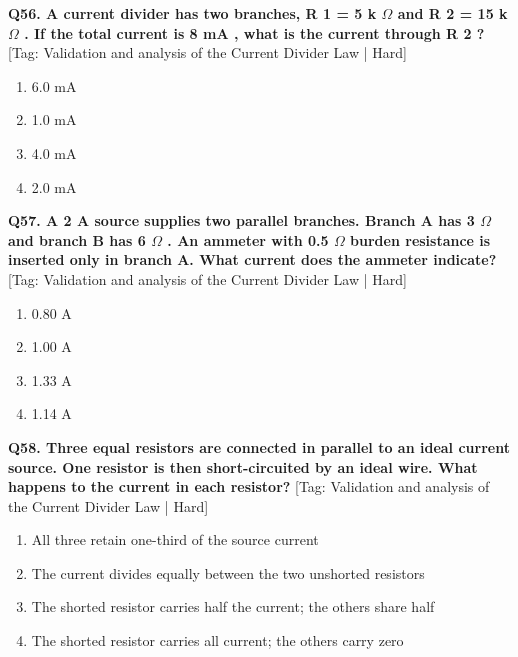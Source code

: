\noindent\textbf{Q56. A current divider has two branches, R 1 = 5 k $\Omega$ and R 2 = 15 k $\Omega$ . If the total current is 8 mA , what is the current through R 2 ?} \hfill [Tag: Validation and analysis of the Current Divider Law | Hard]
\begin{enumerate}[label=(\alph*),topsep=2pt,itemsep=1pt,partopsep=0pt,parsep=0pt]
    \item {6.0 mA}
    \item {1.0 mA}
    \item {4.0 mA}
    \item {2.0 mA}
\end{enumerate}
\vspace{2mm}

\noindent\textbf{Q57. A 2 A source supplies two parallel branches. Branch A has 3 $\Omega$ and branch B has 6 $\Omega$ . An ammeter with 0.5 $\Omega$ burden resistance is inserted only in branch A. What current does the ammeter indicate?} \hfill [Tag: Validation and analysis of the Current Divider Law | Hard]
\begin{enumerate}[label=(\alph*),topsep=2pt,itemsep=1pt,partopsep=0pt,parsep=0pt]
    \item {0.80 A}
    \item {1.00 A}
    \item {1.33 A}
    \item {1.14 A}
\end{enumerate}
\vspace{2mm}

\noindent\textbf{Q58. Three equal resistors are connected in parallel to an ideal current source. One resistor is then short-circuited by an ideal wire. What happens to the current in each resistor?} \hfill [Tag: Validation and analysis of the Current Divider Law | Hard]
\begin{enumerate}[label=(\alph*),topsep=2pt,itemsep=1pt,partopsep=0pt,parsep=0pt]
    \item {All three retain one-third of the source current}
    \item {The current divides equally between the two unshorted resistors}
    \item {The shorted resistor carries half the current; the others share half}
    \item {The shorted resistor carries all current; the others carry zero}
\end{enumerate}
\vspace{2mm}

